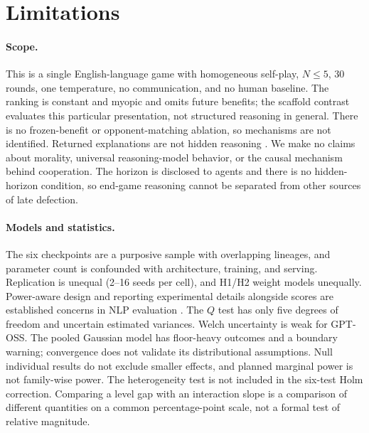 \documentclass[11pt]{article}
\begin{document}
\section*{Limitations}
\paragraph{Scope.} This is a single English-language game with homogeneous self-play, $N\le5$, 30 rounds, one temperature, no communication, and no human baseline. The ranking is constant and myopic and omits future benefits; the scaffold contrast evaluates this particular presentation, not structured reasoning in general. There is no frozen-benefit or opponent-matching ablation, so mechanisms are not identified. Returned explanations are not hidden reasoning \citep{turpin2023unfaithful,lanham2023faithfulness}. We make no claims about morality, universal reasoning-model behavior, or the causal mechanism behind cooperation. The horizon is disclosed to agents and there is no hidden-horizon condition, so end-game reasoning cannot be separated from other sources of late defection.

\paragraph{Models and statistics.} The six checkpoints are a purposive sample with overlapping lineages, and parameter count is confounded with architecture, training, and serving. Replication is unequal (2--16 seeds per cell), and H1/H2 weight models unequally. Power-aware design and reporting experimental details alongside scores are established concerns in NLP evaluation \citep{card2020power,dodge2019reporting}. The $Q$ test has only five degrees of freedom and uncertain estimated variances. Welch uncertainty is weak for GPT-OSS. The pooled Gaussian model has floor-heavy outcomes and a boundary warning; convergence does not validate its distributional assumptions. Null individual results do not exclude smaller effects, and planned marginal power is not family-wise power. The heterogeneity test is not included in the six-test Holm correction. Comparing a level gap with an interaction slope is a comparison of different quantities on a common percentage-point scale, not a formal test of relative magnitude.
\end{document}
